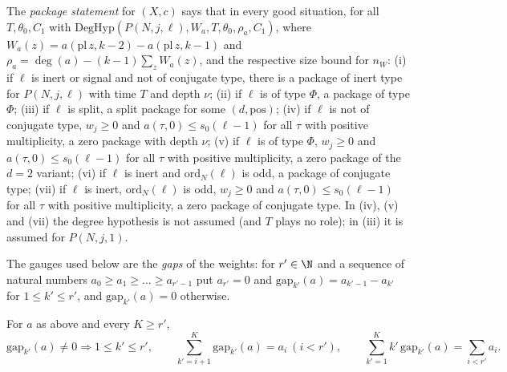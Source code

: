 \begin{definition}
The \emph{package statement} for $(X,c)$ says that in every good situation, for all $T,\theta_0,C_1$ with
$\mathrm{DegHyp}(P(N,j,\ell),W_a,T,\theta_0,\rho_a,C_1)$, where $W_a(z)=a(\mathrm{pl}\,z,k-2)-a(\mathrm{pl}\,z,k-1)$ and
$\rho_a=\deg(a)-(k-1)\sum_zW_a(z)$, and the respective size bound for $n_W$: (i) if $\ell$ is inert or signal and not of conjugate
type, there is a package of inert type for $P(N,j,\ell)$ with time $T$ and depth $\nu$; (ii) if $\ell$ is of type $\Phi$, a package
of type $\Phi$; (iii) if $\ell$ is split, a split package for some $(d,\mathrm{pos})$; (iv) if $\ell$ is not of conjugate type,
$w_j\ge0$ and $a(\tau,0)\le s_0(\ell-1)$ for all $\tau$ with positive multiplicity, a zero package with depth $\nu$; (v) if $\ell$ is of type $\Phi$, $w_j\ge0$ and $a(\tau,0)\le s_0(\ell-1)$ for all $\tau$ with positive
multiplicity, a zero package of the $d=2$ variant; (vi) if $\ell$ is inert and $\mathrm{ord}_N(\ell)$ is odd, a package of conjugate
type; (vii) if $\ell$ is inert, $\mathrm{ord}_N(\ell)$ is odd, $w_j\ge0$ and $a(\tau,0)\le s_0(\ell-1)$ for all $\tau$ with positive
multiplicity, a zero package of conjugate type. In (iv), (v) and (vii) the degree hypothesis is not assumed
(and $T$ plays no role); in (iii) it is assumed for $P(N,j,1)$.
\end{definition}

The gauges used below are the \emph{gaps} of the weights: for $r'\in\N$ and a sequence of natural numbers $a_0\ge a_1\ge\dots\ge
a_{r'-1}$ put $a_{r'}=0$ and $\mathrm{gap}_{k'}(a)=a_{k'-1}-a_{k'}$ for $1\le k'\le r'$, and $\mathrm{gap}_{k'}(a)=0$ otherwise.

\begin{lemma}\label{pf:onto2:gaplem}
For $a$ as above and every $K\ge r'$,
\begin{equation}\label{eq:pf:onto2:gaps}
\mathrm{gap}_{k'}(a)\ne0\Rightarrow1\le k'\le r',\qquad \sum_{k'=i+1}^{K}\mathrm{gap}_{k'}(a)=a_i\ (i<r'),\qquad
\sum_{k'=1}^{K}k'\,\mathrm{gap}_{k'}(a)=\sum_{i<r'}a_i .
\end{equation}
\end{lemma}

